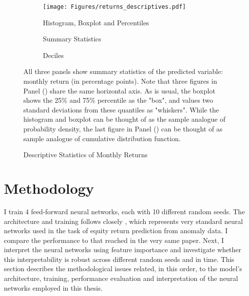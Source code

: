 		\begin{figure}	
			\centering		
			\begin{subfigure}[t]{\textwidth}
				\texttt{[image: Figures/returns\_descriptives.pdf]}
				\caption{Histogram, Boxplot and Percentiles}
				\label{fig:returns_descriptives_plot}
			\end{subfigure}
		
			\bigskip
			\begin{subfigure}[t]{\textwidth}
				\centering
				
				\caption{Summary Statistics}
				\label{fig:return_descriptives_table}
			\end{subfigure}
			
			\bigskip
			\begin{subfigure}[t]{\textwidth}
				\centering
				
				\caption{Deciles}
				\label{fig:return_deciles_table}
			\end{subfigure}
		
			\caption{Descriptive Statistics of Monthly Returns}
			\label{fig:return_descriptives}
			\medskip
			\small
			All three panels show summary statistics of the predicted variable: monthly return (in percentage points). Note that three figures in Panel () share the same horizontal axis. As is usual, the boxplot shows the 25\% and 75\% percentile as the "box", and values two standard deviations from these quantiles as "whiskers". While the histogram and boxplot can be thought of as the sample analogue of probability density, the last figure in Panel () can be thought of as sample analogue of cumulative distribution function. 
		\end{figure}

	


\section{Methodology}

	I train 4 feed-forward neural networks, each with 10 different random seeds. The architecture and training follows closely \cite{gu2020empirical}, which represents very standard neural networks used in the task of equity return prediction from anomaly data. I compare the performance to that reached in the very same paper. Next, I interpret the neural networks using feature importance and investigate whether this interpretability is robust across different random seeds and in time. This  section describes the methodological issues related, in this order, to the model's architecture, training, performance evaluation and interpretation of the neural networks employed in this thesis.
	
